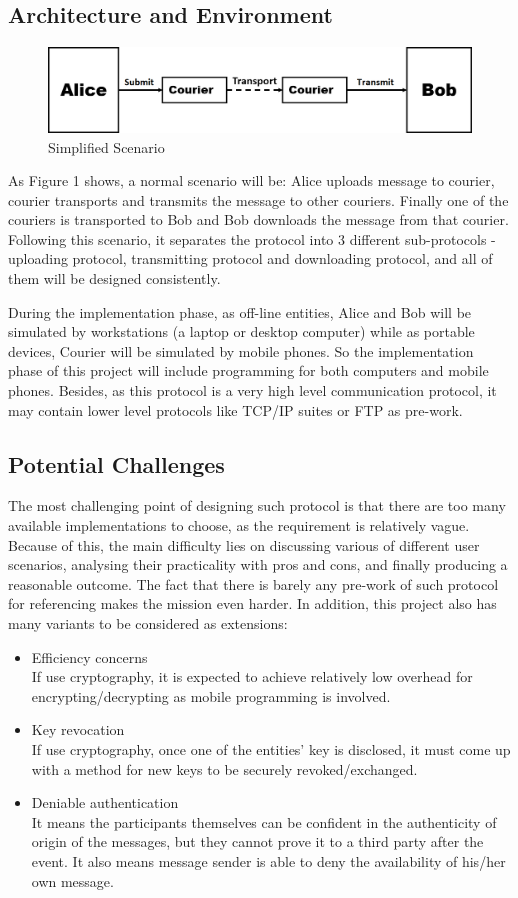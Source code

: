 \documentclass[11pt,a4paper]{article}
\begin{document}
\subsection{Architecture and Environment}
\begin{figure}[h!]
\includegraphics[width=\textwidth,natwidth=1957,natheight=256]{flowchart.png}
\caption{Simplified Scenario}
\end{figure}
As Figure 1 shows, a normal scenario will be: Alice uploads message to courier, courier transports and transmits the message to other couriers. Finally one of the couriers is transported to Bob and Bob downloads the message from that courier. Following this scenario, it separates the protocol into 3 different sub-protocols - uploading protocol, transmitting protocol and downloading protocol, and all of them will be designed consistently.\par
During the implementation phase, as off-line entities, Alice and Bob will be simulated by workstations (a laptop or desktop computer) while as portable devices, Courier will be simulated by mobile phones. So the implementation phase of this project will include programming for both computers and mobile phones. Besides, as this protocol is a very high level communication protocol, it may contain lower level protocols like TCP/IP suites or FTP as pre-work. 
\subsection{Potential Challenges}
The most challenging point of designing such protocol is that there are too many available implementations to choose, as the requirement is relatively vague. Because of this, the main difficulty lies on discussing various of different user scenarios, analysing their practicality with pros and cons, and finally producing a reasonable outcome. The fact that there is barely any pre-work of such protocol for referencing makes the mission even harder. In addition, this project also has many variants to be considered as extensions:
\begin{itemize}
\item Efficiency concerns\\
If use cryptography, it is expected to achieve relatively low overhead for encrypting/decrypting as mobile programming is involved.
\item Key revocation\\
If use cryptography, once one of the entities’ key is disclosed, it must come up with a method for new keys to be securely revoked/exchanged.
\item Deniable authentication\\
It means the participants themselves can be confident in the authenticity of origin of the messages, but they cannot prove it to a third party after the event. It also means message sender is able to deny the availability of his/her own message.
\end{itemize}
\end{document}
